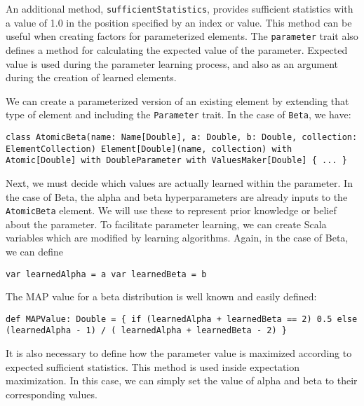 An additional method,  \texttt{sufficientStatistics}, provides sufficient statistics with a value of 1.0 in the position specified by an index or value. This method can be useful when creating factors for parameterized elements. The \texttt{parameter} trait also defines a method for calculating the expected value of the parameter. Expected value is used during the parameter learning process, and also as an argument during the creation of learned elements.

We can create a parameterized version of an existing element by extending that type of element and including the \texttt{Parameter} trait. In the case of \texttt{Beta}, we have:

\begin{flushleft}
\texttt{class AtomicBeta(name: Name[Double], a: Double, b: Double, collection: ElementCollection) Element[Double](name, collection) with Atomic[Double] with
DoubleParameter with ValuesMaker[Double] \{ ... \}
}
\end{flushleft}

Next, we must decide which values are actually learned within the parameter. In the case of Beta, the alpha and beta hyperparameters are already inputs to the \texttt{AtomicBeta} element. We will use these to represent prior knowledge or belief about the parameter. To facilitate parameter learning, we can create Scala variables which are modified by learning algorithms. Again, in the case of Beta, we can define

\begin{flushleft}
\texttt{var learnedAlpha = a 
\newline var learnedBeta = b
}
\end{flushleft}

The MAP value for a beta distribution is well known and easily defined:

\begin{flushleft}
\texttt{def MAPValue: Double = \{
\newline \tab if (learnedAlpha + learnedBeta == 2) 0.5
\newline \tab else (learnedAlpha - 1) / ( learnedAlpha + learnedBeta - 2)
\newline \}
}
\end{flushleft}

It is also necessary to define how the parameter value is maximized according to expected sufficient statistics. This method is used inside expectation maximization. In this case, we can simply set the value of alpha and beta to their corresponding values.

